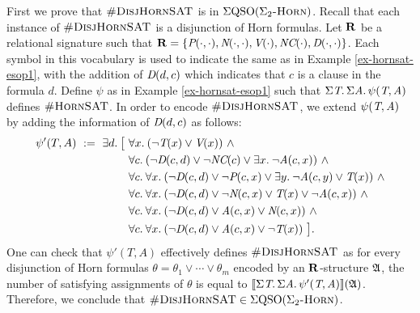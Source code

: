 
First we prove that $\textsc{\#DisjHornSAT}$ is in $\Sigma{\rm QSO}(\Sigma_2\textsc{-Horn})$. Recall that each instance of $\textsc{\#DisjHornSAT}$ is a disjunction of Horn formulas. Let $\mathbf{R}$ be a relational signature such that $\mathbf{R} = \{\textit{P}(\cdot,\cdot), \textit{N}(\cdot,\cdot), \textit{V}(\cdot), \textit{NC}(\cdot), \textit{D}(\cdot,\cdot)\}$. Each symbol in this vocabulary is used to indicate the same as in Example \ref{ex-hornsat-esop1}, with the addition of $\textit{D}(d,c)$ which indicates that $c$ is a clause in the formula $d$. Define $\psi$ as in Example \ref{ex-hornsat-esop1} such that $\Sigma{\textit{T}}.\, \Sigma{\textit{A}}.\, \psi(\textit{T},\textit{A})$
defines $\textsc{\#HornSAT}$. In order to encode $\textsc{\#DisjHornSAT}$, we extend $\psi(\textit{T},\textit{A})$ by adding the information of $\textit{D}(d,c)$ as follows:
\begin{align*}
\psi'(T,A) \ := \ \exists{d}.\: \big[ \ & \forall{x}.\: (\neg \textit{T}(x) \vee \textit{V}(x)) \ \wedge\\
& \forall{c}.\: (\neg \textit{D}(c,d)\vee \neg \textit{NC}(c) \vee  \exists{x}.\: \neg \textit{A}(c,x)) \ \wedge\\
& \forall{c}.\: \forall{x}.\: (\neg \textit{D}(c,d)\vee\neg \textit{P}(c,x) \vee \exists{y}.\: \neg \textit{A}(c,y) \vee \textit{T}(x)) \ \wedge\\
& \forall{c}.\: \forall{x}.\: (\neg \textit{D}(c,d)\vee\neg \textit{N}(c,x) \vee \textit{T}(x) \vee \neg \textit{A}(c,x)) \ \wedge\\
& \forall{c}.\: \forall{x}.\:  (\neg \textit{D}(c,d)\vee\textit{A}(c,x) \vee \textit{N}(c,x)) \ \wedge\\
& \forall{c}.\: \forall{x}.\: (\neg \textit{D}(c,d)\vee\textit{A}(c,x) \vee \neg\textit{T}(x)) \ \big].
\end{align*}
One can check that $\psi'(T,A)$ effectively defines $\textsc{\#DisjHornSAT}$ as for every disjunction of Horn formulas $\theta = \theta_1\vee\cdots\vee\theta_m$ encoded by an $\mathbf{R}$-structure $\mathfrak{A}$, the number of satisfying assignments of $\theta$ is equal to ${\llbracket{}{\Sigma{\textit{T}}.\, \Sigma{\textit{A}}.\, \psi'(\textit{T},\textit{A})}\rrbracket}(\mathfrak{A})$.  Therefore, we conclude that $\textsc{\#DisjHornSAT} \in \Sigma{\rm QSO}(\Sigma_2\textsc{-Horn})$.

